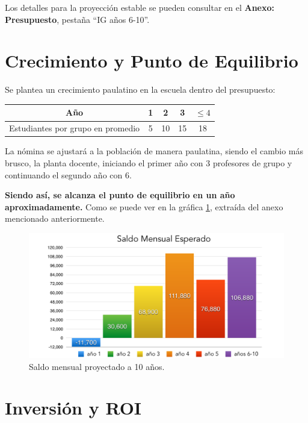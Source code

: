 \documentclass[10pt,letterpaper,oneside]{book}
\begin{document}
Los detalles para la proyección estable se pueden consultar en el {\bf Anexo: Presupuesto}, pestaña ``IG años 6-10''.


\section{Crecimiento y Punto de Equilibrio}

Se plantea un crecimiento paulatino en la escuela dentro del presupuesto:
\begin{center}
\begin{tabular}{|c|c|c|c|c|}
\hline 
Año & 1 & 2 & 3 & $\leq 4$ \\ 
\hline 
Estudiantes por grupo en promedio & 5 & 10 & 15 & 18 \\ 
\hline 
\end{tabular}
\end{center} 

La nómina se ajustará a la población de manera paulatina, siendo el cambio más brusco, la planta docente, iniciando el primer año con 3 profesores de grupo y continuando el segundo año con 6.

\vspace{0.3cm}
{\bf\large \color{red} Siendo así, se alcanza el punto de equilibrio en un año aproximadamente.} Como se puede ver en la gráfica \ref{mensualProyeccion}, extraída del anexo mencionado anteriormente.

\begin{figure}[h]
\begin{center}
\includegraphics[scale=0.4]{mensual10anos.pdf}
\caption{Saldo mensual proyectado a 10 años.}
\label{mensualProyeccion}
\end{center}
\end{figure}

\section{Inversión y ROI}
\end{document}
